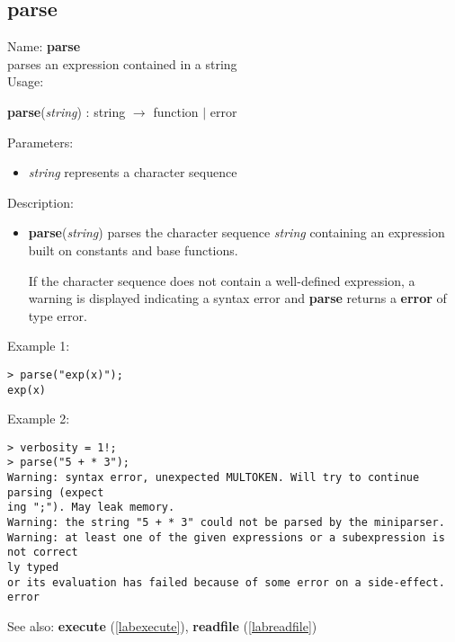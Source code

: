 \subsection{parse}
\label{labparse}
\noindent Name: \textbf{parse}\\
parses an expression contained in a string\\
\noindent Usage: 
\begin{center}
\textbf{parse}(\emph{string}) : \textsf{string} $\rightarrow$ \textsf{function} $|$ \textsf{error}
\end{center}
Parameters: 
\begin{itemize}
\item \emph{string} represents a character sequence
\end{itemize}
\noindent Description: \begin{itemize}

\item \textbf{parse}(\emph{string}) parses the character sequence \emph{string} containing
   an expression built on constants and base functions.
    
   If the character sequence does not contain a well-defined expression,
   a warning is displayed indicating a syntax error and \textbf{parse} returns
   a \textbf{error} of type \textsf{error}.
\end{itemize}
\noindent Example 1: 
\begin{center}\begin{minipage}{15cm}\begin{Verbatim}[frame=single]
> parse("exp(x)");
exp(x)
\end{Verbatim}
\end{minipage}\end{center}
\noindent Example 2: 
\begin{center}\begin{minipage}{15cm}\begin{Verbatim}[frame=single]
> verbosity = 1!;
> parse("5 + * 3");
Warning: syntax error, unexpected MULTOKEN. Will try to continue parsing (expect
ing ";"). May leak memory.
Warning: the string "5 + * 3" could not be parsed by the miniparser.
Warning: at least one of the given expressions or a subexpression is not correct
ly typed
or its evaluation has failed because of some error on a side-effect.
error
\end{Verbatim}
\end{minipage}\end{center}
See also: \textbf{execute} (\ref{labexecute}), \textbf{readfile} (\ref{labreadfile})
